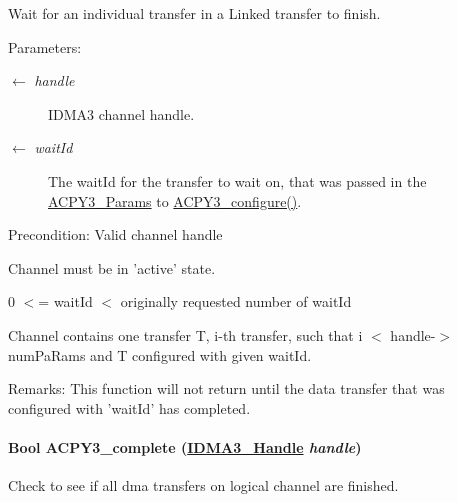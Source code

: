 Wait for an individual transfer in a Linked transfer to finish. 

\begin{Desc}
\item[Parameters:]
\begin{description}
\item[\mbox{$\leftarrow$} {\em handle}]IDMA3 channel handle. \item[\mbox{$\leftarrow$} {\em wait\-Id}]The wait\-Id for the transfer to wait on, that was passed in the \hyperlink{struct_a_c_p_y3___params}{ACPY3\_\-Params} to \hyperlink{group___d_s_p_a_c_p_y3_g427e8e4fd5c445b2f9bb5d971c06c099}{ACPY3\_\-configure()}.\end{description}
\end{Desc}
\begin{Desc}
\item[Precondition:]Valid channel handle 

Channel must be in 'active' state. 

0 $<$= wait\-Id $<$ originally requested number of wait\-Id 

Channel contains one transfer T, i-th transfer, such that i $<$ handle-$>$num\-Pa\-Rams and T configured with given wait\-Id.\end{Desc}
\begin{Desc}
\item[Remarks:]This function will not return until the data transfer that was configured with 'wait\-Id' has completed. \end{Desc}
\hypertarget{group___d_s_p_a_c_p_y3_ge22deca1f6878a359a619cff8654d9de}{
\paragraph[ACPY3\_\-complete]{\setlength{\rightskip}{0pt plus 5cm}Bool ACPY3\_\-complete (\hyperlink{struct_i_d_m_a3___obj}{IDMA3\_\-Handle} {\em handle})}\hfill}
\label{group___d_s_p_a_c_p_y3_ge22deca1f6878a359a619cff8654d9de}


Check to see if all dma transfers on logical channel are finished. 

